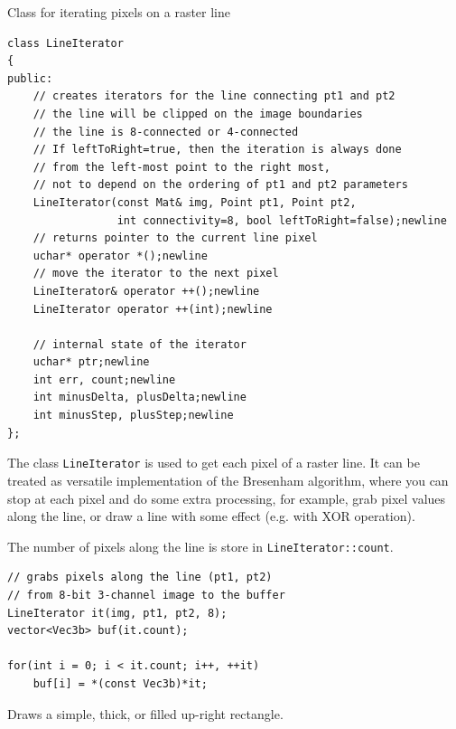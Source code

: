 Class for iterating pixels on a raster line

\begin{lstlisting}
class LineIterator
{
public:
    // creates iterators for the line connecting pt1 and pt2
    // the line will be clipped on the image boundaries
    // the line is 8-connected or 4-connected
    // If leftToRight=true, then the iteration is always done
    // from the left-most point to the right most,
    // not to depend on the ordering of pt1 and pt2 parameters
    LineIterator(const Mat& img, Point pt1, Point pt2,
                 int connectivity=8, bool leftToRight=false);newline
    // returns pointer to the current line pixel
    uchar* operator *();newline
    // move the iterator to the next pixel
    LineIterator& operator ++();newline
    LineIterator operator ++(int);newline

    // internal state of the iterator
    uchar* ptr;newline
    int err, count;newline
    int minusDelta, plusDelta;newline
    int minusStep, plusStep;newline
};
\end{lstlisting}

The class \texttt{LineIterator} is used to get each pixel of a raster line. It can be treated as versatile implementation of the Bresenham algorithm, where you can stop at each pixel and do some extra processing, for example, grab pixel values along the line, or draw a line with some effect (e.g. with XOR operation).

The number of pixels along the line is store in \texttt{LineIterator::count}.

\begin{lstlisting}
// grabs pixels along the line (pt1, pt2)
// from 8-bit 3-channel image to the buffer
LineIterator it(img, pt1, pt2, 8);
vector<Vec3b> buf(it.count);

for(int i = 0; i < it.count; i++, ++it)
    buf[i] = *(const Vec3b)*it;
\end{lstlisting}


Draws a simple, thick, or filled up-right rectangle.

\begin{description}
\end{description}

